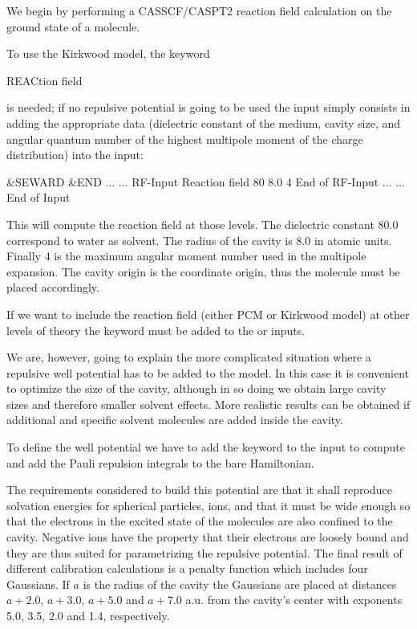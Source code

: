 
We begin by performing a CASSCF/CASPT2 reaction field calculation
on the ground state of a molecule.

To use the Kirkwood model, the keyword

\begin{inputlisting}
REACtion field
\end{inputlisting}

is needed; if no repulsive potential is going to be used the input
simply consists in adding the 
appropriate data (dielectric constant of the medium, cavity size, and
angular quantum number of the highest multipole moment of the charge
distribution) into the  input:

\begin{inputlisting}
 &SEWARD &END
...
...
RF-Input      
Reaction field
80 8.0 4
End of RF-Input
...
...
End of Input
\end{inputlisting}

This will compute the reaction field at those levels. The dielectric
constant 80.0 correspond to water as solvent. The radius of the cavity 
is 8.0 in atomic units. Finally 4 is the maximum angular moment
number used in the multipole expansion. The cavity origin is the
coordinate origin, thus the molecule must be placed accordingly. 

If we want to include the reaction field (either PCM or Kirkwood
model)
at other levels of theory the keyword  must be
added to the  or  inputs.

We are, however, going to explain the more complicated situation where
a repulsive well potential has to be added to the model. In this case
it is convenient to optimize the size of the cavity, although
in so doing we obtain large cavity sizes and therefore
smaller solvent effects. More realistic results can be obtained if
additional and specific solvent molecules are added inside the cavity.


To define the well potential we have to add the keyword 
 to the  input to compute and add the
Pauli repulsion integrals to the bare Hamiltonian. 

The requirements considered to build this potential
are that it shall reproduce solvation energies for spherical particles,
ions, and that it must be wide enough so that the electrons in the
excited state of the molecules are also confined to the cavity. Negative ions
have the property that their electrons are loosely bound and they are thus suited
for parametrizing the repulsive potential. 
The final result of different calibration calculations 
\cite{Bernhardsson:96a,Serrano:97b} is a penalty function which includes four 
Gaussians. If $a$ is
the radius of the cavity the Gaussians are placed at distances $a+2.0$,
$a+3.0$, $a+5.0$ and $a+7.0$ a.u. from the cavity's center with
exponents 5.0, 3.5, 2.0 and 1.4, respectively.

